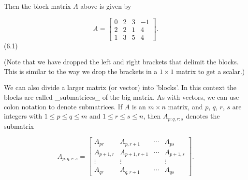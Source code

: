 Then the block matrix \(A\) above is given by

\[A=\left[\begin{array}{cccc}0&2&3&-1\\ 2&2&1&4\\ 1&3&5&4\end{array}\right].\] (6.1)

(Note that we have dropped the left and right brackets that delimit the blocks. This is similar to the way we drop the brackets in a \(1\times 1\) matrix to get a scalar.)

We can also divide a larger matrix (or vector) into 'blocks'. In this context the blocks are called _submatrices_ of the big matrix. As with vectors, we can use colon notation to denote submatrices. If \(A\) is an \(m\times n\) matrix, and \(p\), \(q\), \(r\), \(s\) are integers with \(1\leq p\leq q\leq m\) and \(1\leq r\leq s\leq n\), then \(A_{p:q,r:s}\) denotes the submatrix

\[A_{p:q,r:s}=\left[\begin{array}{cccc}A_{pr}&A_{p,r+1}&\cdots&A_{ps}\\ A_{p+1,r}&A_{p+1,r+1}&\cdots&A_{p+1,s}\\ \vdots&\vdots&&\vdots\\ A_{qr}&A_{q,r+1}&\cdots&A_{qs}\end{array}\right].\] 